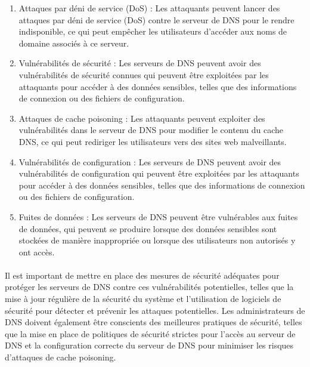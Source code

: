 \begin{enumerate}
	\item Attaques par déni de service (DoS) : Les attaquants peuvent lancer des attaques par déni de service (DoS) contre le serveur de DNS pour le rendre indisponible, ce qui peut empêcher les utilisateurs d'accéder aux noms de domaine associés à ce serveur.
	
	 \item   Vulnérabilités de sécurité : Les serveurs de DNS peuvent avoir des vulnérabilités de sécurité connues qui peuvent être exploitées par les attaquants pour accéder à des données sensibles, telles que des informations de connexion ou des fichiers de configuration.
	
	\item   Attaques de cache poisoning : Les attaquants peuvent exploiter des vulnérabilités dans le serveur de DNS pour modifier le contenu du cache DNS, ce qui peut rediriger les utilisateurs vers des sites web malveillants.
	
	\item   Vulnérabilités de configuration : Les serveurs de DNS peuvent avoir des vulnérabilités de configuration qui peuvent être exploitées par les attaquants pour accéder à des données sensibles, telles que des informations de connexion ou des fichiers de configuration.
	
	\item  Fuites de données : Les serveurs de DNS peuvent être vulnérables aux fuites de données, qui peuvent se produire lorsque des données sensibles sont stockées de manière inappropriée ou lorsque des utilisateurs non autorisés y ont accès.
	
\end{enumerate}

\paragraph{ }
Il est important de mettre en place des mesures de sécurité adéquates pour protéger les serveurs de DNS contre ces vulnérabilités potentielles, telles que la mise à jour régulière de la sécurité du système et l'utilisation de logiciels de sécurité pour détecter et prévenir les attaques potentielles. Les administrateurs de DNS doivent également être conscients des meilleures pratiques de sécurité, telles que la mise en place de politiques de sécurité strictes pour l'accès au serveur de DNS et la configuration correcte du serveur de DNS pour minimiser les risques d'attaques de cache poisoning.
 
